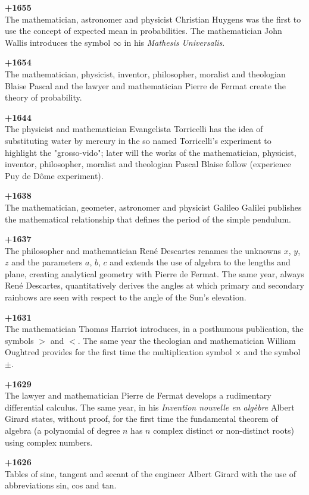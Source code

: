 \textbf{+1655}\\
The mathematician, astronomer and physicist Christian Huygens was the first to use the concept of expected mean in probabilities. The mathematician John Wallis introduces the symbol $\infty$ in his \textit{Mathesis Universalis}.

\textbf{+1654}\\
The mathematician, physicist, inventor, philosopher, moralist and theologian Blaise Pascal and the lawyer and mathematician Pierre de Fermat create the theory of probability.

\textbf{+1644}\\
The physicist and mathematician Evangelista Torricelli has the idea of substituting water by mercury in the so named Torricelli's experiment to highlight the "grosso-vido"; later will the works of the mathematician, physicist, inventor, philosopher, moralist and theologian Pascal Blaise follow (experience Puy de Dôme experiment).

\textbf{+1638}\\
The mathematician, geometer, astronomer and physicist Galileo Galilei publishes the mathematical relationship that defines the period of the simple pendulum.

\textbf{+1637}\\
The philosopher and mathematician René Descartes renames the unknowns $x$, $y$, $z$ and the parameters $a$, $b$, $c$ and extends the use of algebra to the lengths and plane, creating analytical geometry with Pierre de Fermat. The same year, always René Descartes, quantitatively derives the angles at which primary and secondary rainbows are seen with respect to the angle of the Sun's elevation.

\textbf{+1631}\\
The mathematician Thomas Harriot introduces, in a posthumous publication, the symbols $>$ and $<$. The same year the theologian and mathematician William Oughtred provides for the first time the multiplication symbol $\times$ and the symbol $\pm$.

\textbf{+1629}\\
The lawyer and mathematician Pierre de Fermat develops a rudimentary differential calculus. The same year, in his \textit{Invention nouvelle en algèbre} Albert Girard states, without proof, for the first time the fundamental theorem of algebra (a polynomial of degree $n$ has $n$ complex distinct or non-distinct roots) using complex numbers.

\textbf{+1626}\\
Tables of sine, tangent and secant of the engineer Albert Girard with the use of abbreviations sin, cos and tan.

